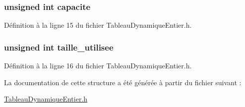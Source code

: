 \hypertarget{struct_tableau_dynamique_entier_ac3e3c7196292bbc416a904d29ee638c8}{
\subsubsection[{capacite}]{\setlength{\rightskip}{0pt plus 5cm}unsigned int capacite}}\label{struct_tableau_dynamique_entier_ac3e3c7196292bbc416a904d29ee638c8}


Définition à la ligne 15 du fichier Tableau\-Dynamique\-Entier.\-h.

\hypertarget{struct_tableau_dynamique_entier_aaf681889cbd00b7c45951f63b10f969a}{
\subsubsection[{taille\-\_\-utilisee}]{\setlength{\rightskip}{0pt plus 5cm}unsigned int taille\-\_\-utilisee}}\label{struct_tableau_dynamique_entier_aaf681889cbd00b7c45951f63b10f969a}


Définition à la ligne 16 du fichier Tableau\-Dynamique\-Entier.\-h.



La documentation de cette structure a été générée à partir du fichier suivant \-:\begin{DoxyCompactItemize}
\item 
\hyperlink{_tableau_dynamique_entier_8h}{Tableau\-Dynamique\-Entier.\-h}\end{DoxyCompactItemize}
